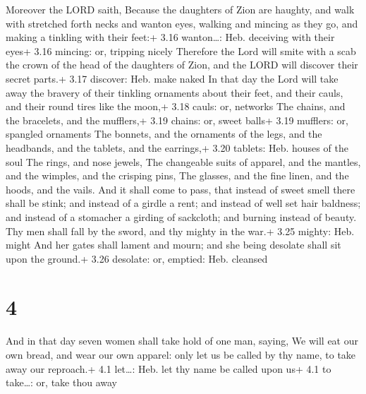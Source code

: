  Moreover the LORD saith, Because the daughters of Zion
are haughty, and walk with stretched forth necks and wanton eyes,
walking and mincing as they go, and making a tinkling with their feet:+
3.16 wanton\ldots: Heb. deceiving with their eyes+ 3.16 mincing: or,
tripping nicely  Therefore the Lord will smite with a scab
the crown of the head of the daughters of Zion, and the LORD will
discover their secret parts.+ 3.17 discover: Heb. make naked
 In that day the Lord will take away the bravery of their
tinkling ornaments about their feet, and their cauls, and their round
tires like the moon,+ 3.18 cauls: or, networks  The chains,
and the bracelets, and the mufflers,+ 3.19 chains: or, sweet balls+ 3.19
mufflers: or, spangled ornaments  The bonnets, and the
ornaments of the legs, and the headbands, and the tablets, and the
earrings,+ 3.20 tablets: Heb. houses of the soul  The
rings, and nose jewels,  The changeable suits of apparel,
and the mantles, and the wimples, and the crisping pins, 
The glasses, and the fine linen, and the hoods, and the vails.
 And it shall come to pass, that instead of sweet smell
there shall be stink; and instead of a girdle a rent; and instead of
well set hair baldness; and instead of a stomacher a girding of
sackcloth; and burning instead of beauty.  Thy men shall
fall by the sword, and thy mighty in the war.+ 3.25 mighty: Heb. might
 And her gates shall lament and mourn; and she being
desolate shall sit upon the ground.+ 3.26 desolate: or, emptied: Heb.
cleansed

\hypertarget{section-3}{%
\section{4}\label{section-3}}

 And in that day seven women shall take hold of one man,
saying, We will eat our own bread, and wear our own apparel: only let us
be called by thy name, to take away our reproach.+ 4.1 let\ldots: Heb.
let thy name be called upon us+ 4.1 to take\ldots: or, take thou away

